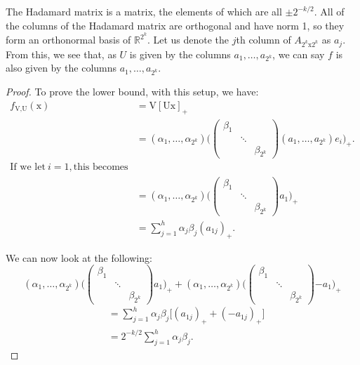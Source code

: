 \documentclass[twoside]{article}
\theoremstyle{definition}
\theoremstyle{definition}
\theoremstyle{remark}
\begin{document}
The Hadamard matrix is a matrix, the elements of which are all $\pm2^{-k/2}$. All of the columns of the Hadamard matrix are orthogonal and have norm 1, so they form an orthonormal basis of $\mathbb{R}^{2^k}$. Let us denote the $j$th column of $A_{2^k \text{x} 2^k}$ as $a_j$. From this, we see that, as $U$ is given by the columns $a_1,\ldots,a_{2^k}$, we can say $f$ is also given by the columns $a_1,\ldots,a_{2^k}$.

\begin{proof}

To prove the lower bound, with this setup, we have:
\[
\begin{aligned}
f_\text{V,U}(\text{x})&=\text{V}[\text{Ux}]_+ \\
&= (\alpha_1,\ldots,\alpha_{2^k}) \Bigg( \begin{pmatrix} 
\beta_1 & & \\
& \ddots & \\
& & \beta_{2^k}
\end{pmatrix}
(a_1,\ldots,a_{2^k}) e_i \Bigg)_+. \\
\text{If we let} \ i=1, \text{this becomes} \\
&= (\alpha_1,\ldots,\alpha_{2^k}) \Bigg( \begin{pmatrix} 
\beta_1 & & \\
& \ddots & \\
& & \beta_{2^k}
\end{pmatrix}
a_1 \Bigg)_+ \\
&= \sum \limits_{j=1}^h \alpha_j \beta_j (a_{1j})_+.
\end{aligned}
\]

We can now look at the following:
\[
(\alpha_1,\ldots,\alpha_{2^k}) \Bigg( \begin{pmatrix} 
\beta_1 & & \\
& \ddots & \\
& & \beta_{2^k}
\end{pmatrix}
a_1 \Bigg)_+ +
(\alpha_1,\ldots,\alpha_{2^k}) \Bigg( \begin{pmatrix} 
\beta_1 & & \\
& \ddots & \\
& & \beta_{2^k}
\end{pmatrix}
{-a}_1 \Bigg)_+
\]
\[
\begin{aligned}
&= \sum \limits_{j=1}^h \alpha_j \beta_j \bigg[ (a_{1j})_+ + (-a_{1j})_+ \bigg] \\
&= 2^{-k/2} \sum \limits_{j=1}^h \alpha_j \beta_j.
\end{aligned}
\]


\end{proof}
\end{document}
